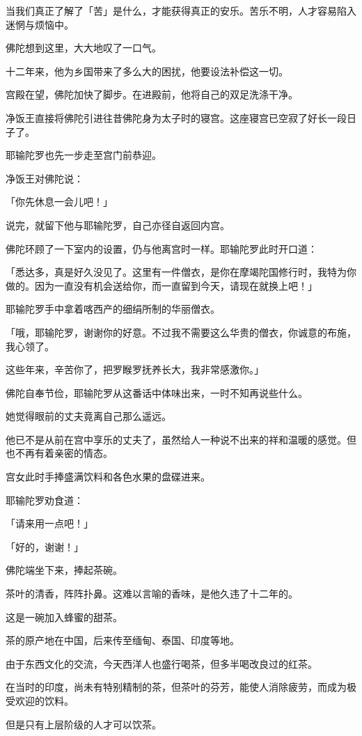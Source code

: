 \documentclass[twoside,openany]{book}
\begin{document}
当我们真正了解了「苦」是什么，才能获得真正的安乐。苦乐不明，人才容易陷入迷惘与烦恼中。

佛陀想到这里，大大地叹了一口气。

十二年来，他为乡国带来了多么大的困扰，他要设法补偿这一切。

宫殿在望，佛陀加快了脚步。在进殿前，他将自己的双足洗涤干净。

净饭王直接将佛陀引进往昔佛陀身为太子时的寝宫。这座寝宫已空寂了好长一段日子了。

耶输陀罗也先一步走至宫门前恭迎。

净饭王对佛陀说：

「你先休息一会儿吧！」

说完，就留下他与耶输陀罗，自己亦径自返回内宫。

佛陀环顾了一下室内的设置，仍与他离宫时一样。耶输陀罗此时开口道：

「悉达多，真是好久没见了。这里有一件僧衣，是你在摩竭陀国修行时，我特为你做的。因为一直没有机会送给你，而一直留到今天，请现在就换上吧！」

耶输陀罗手中拿着喀西产的细绢所制的华丽僧衣。

「哦，耶输陀罗，谢谢你的好意。不过我不需要这么华贵的僧衣，你诚意的布施，我心领了。

这些年来，辛苦你了，把罗睺罗抚养长大，我非常感激你。」

佛陀自奉节俭，耶输陀罗从这番话中体味出来，一时不知再说些什么。

她觉得眼前的丈夫竟离自己那么遥远。

他已不是从前在宫中享乐的丈夫了，虽然给人一种说不出来的祥和温暖的感觉。但也不再有着亲密的情态。

宫女此时手捧盛满饮料和各色水果的盘碟进来。

耶输陀罗劝食道：

「请来用一点吧！」

「好的，谢谢！」

佛陀端坐下来，捧起茶碗。

茶叶的清香，阵阵扑鼻。这难以言喻的香味，是他久违了十二年的。

这是一碗加入蜂蜜的甜茶。

茶的原产地在中国，后来传至缅甸、泰国、印度等地。

由于东西文化的交流，今天西洋人也盛行喝茶，但多半喝改良过的红茶。

在当时的印度，尚未有特别精制的茶，但茶叶的芬芳，能使人消除疲劳，而成为极受欢迎的饮料。

但是只有上层阶级的人才可以饮茶。
\end{document}
